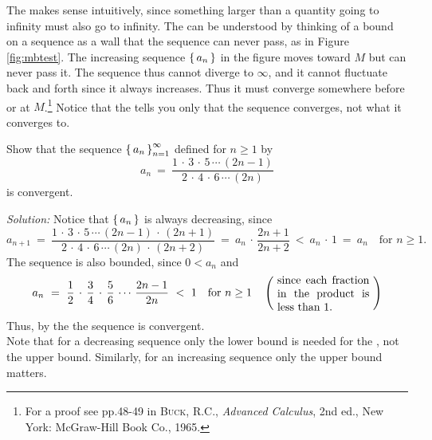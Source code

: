 \piccaption[]{\label{fig:mbtest}}
\noindent The  makes sense intuitively, since something larger
than a quantity going to infinity must also go to infinity. The  can be understood by thinking of a bound on a sequence as a wall that the
sequence can never pass, as in Figure \ref{fig:mbtest}. The increasing sequence
$\left\lbrace\mspace{3mu}a_n\mspace{3mu}\right\rbrace$ in the figure moves toward $M$ but can never pass it. The sequence
thus cannot diverge to
$\infty$, and it cannot fluctuate back and forth since it always increases. Thus
it must converge somewhere before or at $M$.\footnote{For a proof see pp.48-49
in \textsc{Buck, R.C.}, \emph{Advanced Calculus}, 2nd ed., New York: McGraw-Hill
Book Co., 1965.} Notice that the  tells you only that the
sequence converges, not what it converges to.

\begin{exmp}
\noindent Show that the sequence $\left\lbrace\mspace{3mu}a_n\mspace{3mu}\right\rbrace_{n=1}^{\infty}$ defined for $n\ge 1$
by
\[
a_n ~=~ \frac{1 \,\cdot\, 3 \,\cdot\, 5 \,\cdots\, (2n-1)}
{2 \,\cdot\, 4 \,\cdot\, 6 \,\cdots\, (2n)}
\]
is convergent.\vspace{1mm}
\par\noindent\emph{Solution:} Notice that $\left\lbrace\mspace{3mu}a_n\mspace{3mu}\right\rbrace$ is always decreasing,
since
\[
a_{n+1} ~=~ \frac{1 \,\cdot\, 3 \,\cdot\, 5 \,\cdots\, (2n-1) \,\cdot\, (2n+1)}
{2 \,\cdot\, 4 \,\cdot\, 6 \,\cdots\, (2n)\,\cdot\, (2n+2)} ~=~
a_n \,\cdot\, \frac{2n+1}{2n+2} ~<~ a_n \,\cdot\, 1 ~=~ a_n \quad\text{for $n\ge 1$.}
\]
The sequence is also bounded, since $0 < a_n$ and
\[
a_n ~=~ \frac{1}{2} \,\cdot\, \frac{3}{4} \,\cdot\, \frac{5}{6} \,\cdots\,
\frac{2n-1}{2n} ~<~ 1 \quad\text{for $n\ge 1$}\quad\left(~\begin{minipage}{0.24\linewidth}since each fraction in the product is less than 1.\end{minipage}~\right)
\]
Thus, by the 
the sequence is convergent.\\Note that for a decreasing sequence
only the lower bound is needed for the , not the upper
bound. Similarly, for an increasing sequence only the upper bound matters.
\end{exmp}
\divider
\newpage

